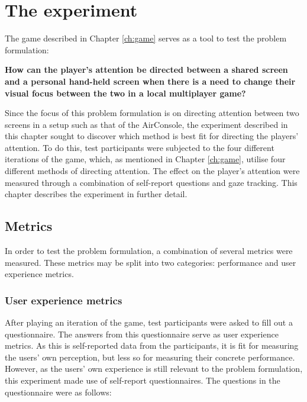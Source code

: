 \chapter{The experiment}\label{ch:experiment}
The game described in Chapter \ref{ch:game} serves as a tool to test the problem formulation:

\begin{changemargin}{1cm}{1cm}
\textbf{How can the player’s attention be directed between a shared screen and a personal hand-held screen when there is a need to change their visual focus between the two in a local multiplayer game?}
\end{changemargin}

Since the focus of this problem formulation is on directing attention between two screens in a setup such as that of the AirConsole, the experiment described in this chapter sought to discover which method is best fit for directing the players' attention. To do this, test participants were subjected to the four different iterations of the game, which, as mentioned in Chapter \ref{ch:game}, utilise four different methods of directing attention. The effect on the player's attention were measured through a combination of self-report questions and gaze tracking. This chapter describes the experiment in further detail.

\section{Metrics}
In order to test the problem formulation, a combination of several metrics were measured. These metrics may be split into two categories: performance and user experience metrics.

\subsection{User experience metrics}\label{subsec:user_experience_metrics}
After playing an iteration of the game, test participants were asked to fill out a questionnaire. The answers from this questionnaire serve as user experience metrics. As this is self-reported data from the participants, it is fit for measuring the users' own perception, but less so for measuring their concrete performance. However, as the users' own experience is still relevant to the problem formulation, this experiment made use of self-report questionnaires. The questions in the questionnaire were as follows:

